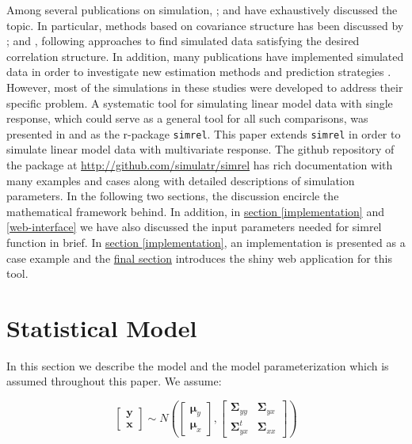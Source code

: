\documentclass[review]{elsarticle}
\theoremstyle{definition}
\theoremstyle{definition}
\theoremstyle{definition}
\theoremstyle{remark}
\begin{document}
Among several publications on simulation,
\citet{johnson2013multivariate}; \citet{ripley2009stochastic} and
\citet{gamerman2006markov} have exhaustively discussed the topic. In
particular, methods based on covariance structure has been discussed by
\citet{arteaga2010simulate}; \citet{arteaga2013building} and
\citet{camacho2017generation}, following approaches to find simulated
data satisfying the desired correlation structure. In addition, many
publications have implemented simulated data in order to investigate new
estimation methods and prediction strategies
\citep[see:][]{cook2015simultaneous, cook2013envelopes, helland2012near}.
However, most of the simulations in these studies were developed to
address their specific problem. A systematic tool for simulating linear
model data with single response, which could serve as a general tool for
all such comparisons, was presented in \citet{saebo2015simrel} and as
the r-package \texttt{simrel}. This paper extends \texttt{simrel} in
order to simulate linear model data with multivariate response. The
github repository of the package at
\url{http://github.com/simulatr/simrel} has rich documentation with many
examples and cases along with detailed descriptions of simulation
parameters. In the following two sections, the discussion encircle the
mathematical framework behind. In addition, in
\protect\hyperlink{implementation}{section \ref{implementation}} and
\protect\hyperlink{web-interface}{\ref{web-interface}} we have also
discussed the input parameters needed for simrel function in brief. In
\protect\hyperlink{implementation}{section \ref{implementation}}, an
implementation is presented as a case example and the
\protect\hyperlink{web-interface}{final section} introduces the shiny
web application for this tool.

\section{Statistical Model}\label{statistical-model}

In this section we describe the model and the model parameterization
which is assumed throughout this paper. We assume:

\begin{equation}
  \begin{bmatrix}\mathbf{y}\\ \mathbf{x}\end{bmatrix} \sim N
  \left(
    \begin{bmatrix}
      \boldsymbol{\mu}_y \\
      \boldsymbol{\mu}_x
    \end{bmatrix},
    \begin{bmatrix}
      \boldsymbol{\Sigma}_{yy} & \boldsymbol{\Sigma}_{yx} \\
      \boldsymbol{\Sigma}_{yx}^t & \boldsymbol{\Sigma}_{xx}
    \end{bmatrix}
  \right)
  \label{eq:rand-reg-model}
\end{equation}
\end{document}
